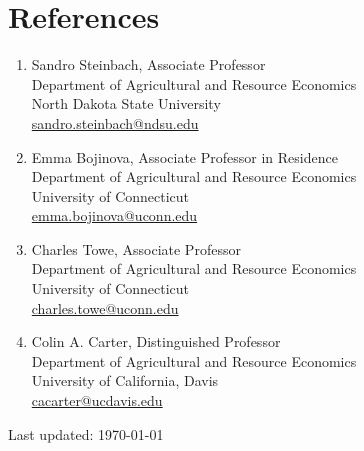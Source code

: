\documentclass[10.5pt,letterpaper]{article}
\begin{document}
	\newpage
	\section*{\textbf{References}}
	\begin{enumerate}[leftmargin=0in]
		\item[] Sandro Steinbach, Associate Professor \\
		Department of Agricultural and Resource Economics \\
		North Dakota State University \\
		\href{mailto:sandro.steinbach@ndsu.edu}{sandro.steinbach@ndsu.edu}
		
		\item[] Emma Bojinova, Associate Professor in Residence \\
		Department of Agricultural and Resource Economics \\
		University of Connecticut \\
		\href{mailto:emma.bojinova@uconn.edu}{emma.bojinova@uconn.edu}
		
		\item[] Charles Towe, Associate Professor \\
		Department of Agricultural and Resource Economics \\
		University of Connecticut \\
		\href{mailto:charles.towe@uconn.edu}{charles.towe@uconn.edu}
		
		\item[] Colin A. Carter, Distinguished Professor \\
		Department of Agricultural and Resource Economics \\
		University of California, Davis \\
		\href{mailto:cacarter@ucdavis.edu}{cacarter@ucdavis.edu}
	\end{enumerate}
	
	\vfill
	\begin{center}
		\begin{footnotesize}
			\raggedleft Last updated: \today
		\end{footnotesize}
	\end{center}
	
\end{document}
